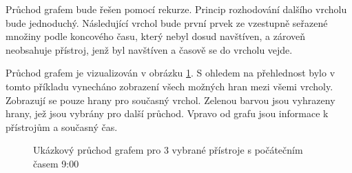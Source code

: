 Průchod grafem bude řešen pomocí rekurze. Princip rozhodování dalšího vrcholu bude jednoduchý. Následující vrchol bude první prvek ze vzestupně seřazené množiny podle koncového času, který nebyl dosud navštíven, a zároveň neobsahuje přístroj, jenž byl navštíven a časově se do vrcholu vejde.

Průchod grafem je vizualizován v obrázku \ref{fig:graph_walk}. S ohledem na přehlednost bylo v tomto příkladu vynecháno zobrazení všech možných hran mezi všemi vrcholy. Zobrazují se pouze hrany pro současný vrchol. Zelenou barvou jsou vyhrazeny hrany, jež jsou vybrány pro další průchod. Vpravo od grafu jsou informace k přístrojům a současný čas.

\begin{figure}
	\centering
	\vspace{2em} %
	\caption{Ukázkový průchod grafem pro 3 vybrané přístroje s počátečním časem 9:00}
	\label{fig:graph_walk}
\end{figure}
